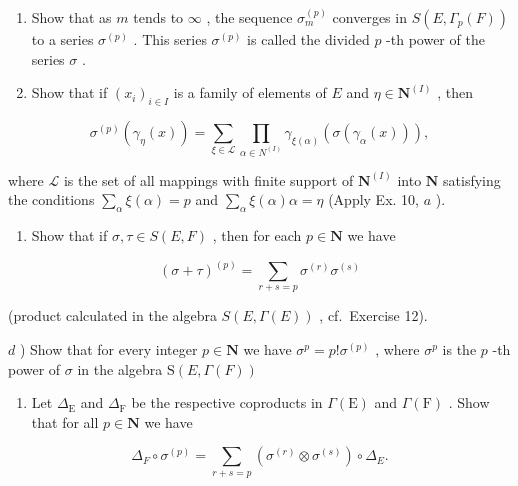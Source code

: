 \begin{enumerate}
\def\labelenumi{\alph{enumi})}
\item
  Show that as \(m\) tends to \(\infty\) , the sequence \(\sigma_{m}^{(p)}\) converges in \(S(E, \Gamma_p(F))\) to a series \(\sigma^{(p)}\) . This series \(\sigma^{(p)}\) is called the divided \(p\) -th power of the series \(\sigma\) .
\item
  Show that if \((x_{i})_{i\in I}\) is a family of elements of \(E\) and \(\eta \in \mathbf{N}^{(I)}\) , then
\end{enumerate}

\[
\sigma^ {(p)} \left(\gamma_ {\eta} (x)\right) = \sum_ {\xi \in \mathscr {L}} \prod_ {\alpha \in N ^ {(I)}} \gamma_ {\xi (\alpha)} \left(\sigma \left(\gamma_ {\alpha} (x)\right)\right),
\]

where \(\mathcal{L}\) is the set of all mappings with finite support of \(\mathbf{N}^{(I)}\) into \(\mathbf{N}\) satisfying the conditions \(\sum_{\alpha} \xi(\alpha) = p\) and \(\sum_{\alpha} \xi(\alpha) \alpha = \eta\) (Apply Ex. 10, \(a\) ).

\begin{enumerate}
\def\labelenumi{\alph{enumi})}
\setcounter{enumi}{2}
\tightlist
\item
  Show that if \(\sigma, \tau \in S(E, F)\) , then for each \(p \in \mathbf{N}\) we have
\end{enumerate}

\[
\left(\sigma + \tau\right) ^ {(p)} = \sum_ {r + s = p} \sigma^ {(r)} \sigma^ {(s)}
\]

(product calculated in the algebra \(S(E, \Gamma(E))\) , cf.~Exercise 12).

\(d\) ) Show that for every integer \(p\in \mathbf{N}\) we have \(\sigma^p = p!\sigma^{(p)}\) , where \(\sigma^p\) is the \(p\) -th power of \(\sigma\) in the algebra \(\mathrm{S}(E, \Gamma(F))\)

\begin{enumerate}
\def\labelenumi{\alph{enumi})}
\setcounter{enumi}{4}
\tightlist
\item
  Let \(\Delta_{\mathrm{E}}\) and \(\Delta_{\mathrm{F}}\) be the respective coproducts in \(\Gamma(\mathrm{E})\) and \(\Gamma(\mathrm{F})\) . Show that for all \(p \in \mathbf{N}\) we have
\end{enumerate}

\[
\Delta_ {F} \circ \sigma^ {(p)} = \sum_ {r + s = p} \left(\sigma^ {(r)} \otimes \sigma^ {(s)}\right) \circ \Delta_ {E}.
\]

